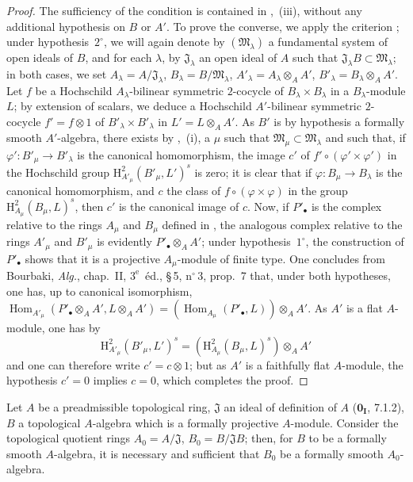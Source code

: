 \begin{proof}
The sufficiency of the condition is contained in ,~(iii), without any additional hypothesis on $B$ or $A'$.
To prove the converse, we apply the criterion ;
under hypothesis~$2^\circ$, we will again denote by $(\mathfrak{M}_\lambda)$ a fundamental system of open ideals of $B$, and for each $\lambda$, by $\mathfrak{J}_\lambda$ an open ideal of $A$ such that $\mathfrak{J}_\lambda B\subset\mathfrak{M}_\lambda$;
in both cases, we set $A_\lambda=A/\mathfrak{J}_\lambda$, $B_\lambda=B/\mathfrak{M}_\lambda$, $A'_\lambda=A_\lambda\otimes_A A'$, $B'_\lambda=B_\lambda\otimes_A A'$.
Let $f$ be a Hochschild $A_\lambda$-bilinear symmetric $2$-cocycle of $B_\lambda\times B_\lambda$ in a $B_\lambda$-module $L$;
by extension of scalars, we deduce a Hochschild $A'$-bilinear symmetric $2$-cocycle $f'=f\otimes1$ of $B'_\lambda\times B'_\lambda$ in $L'=L\otimes_A A'$.
As $B'$ is by hypothesis a formally smooth $A'$-algebra, there exists by ,~(i), a $\mu$ such that $\mathfrak{M}_\mu\subset\mathfrak{M}_\lambda$ and such that, if $\varphi':B'_\mu\to B'_\lambda$ is the canonical homomorphism, the image $c'$ of $f'\circ(\varphi'\times\varphi')$ in the Hochschild group $\mathrm{H}^2_{A'_\mu}(B'_\mu,L')^s$ is zero;
it is clear that if $\varphi:B_\mu\to B_\lambda$ is the canonical homomorphism, and $c$ the class of $f\circ(\varphi\times\varphi)$ in the group $\mathrm{H}^2_{A_\mu}(B_\mu,L)^s$, then $c'$ is the canonical image of $c$.
Now, if $P'_\bullet$ is the complex relative to the rings $A_\mu$ and $B_\mu$ defined in , the analogous complex relative to the rings $A'_\mu$ and $B'_\mu$ is evidently $P'_\bullet\otimes_A A'$;
under hypothesis~$1^\circ$, the construction of $P'_\bullet$ shows that it is a projective $A_\mu$-module of finite type.
One concludes from Bourbaki, \emph{Alg.}, chap.~II, $3^{\text{e}}$~\'{e}d., \S\,5, n$^\circ$\,3, prop.~7 that, under both hypotheses, one has, up to canonical isomorphism, $\operatorname{Hom}_{A'_\mu}(P'_\bullet\otimes_A A',L\otimes_A A')
=(\operatorname{Hom}_{A_\mu}(P'_\bullet,L))\otimes_A A'$.
As $A'$ is a flat $A$-module, one has by 
\[
  \mathrm{H}^2_{A'_\mu}(B'_\mu,L')^s = (\mathrm{H}^2_{A_\mu}(B_\mu,L)^s)\otimes_A A'
\]
and one can therefore write $c'=c\otimes 1$;
but as $A'$ is a faithfully flat $A$-module, the hypothesis $c'=0$ implies $c=0$, which completes the proof.
\end{proof}

\begin{proposition}[19.4.7]
\label{0.19.4.7}
Let $A$ be a preadmissible topological ring, $\mathfrak{J}$ an ideal of definition of $A$ ($\mathbf{0_I}$, 7.1.2), $B$ a topological $A$-algebra which is a formally projective $A$-module.
Consider the topological quotient rings $A_0=A/\mathfrak{J}$, $B_0=B/\mathfrak{J}B$;
then, for $B$ to be a formally smooth $A$-algebra, it is necessary and sufficient that $B_0$ be a formally smooth $A_0$-algebra.
\end{proposition}

